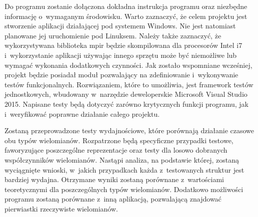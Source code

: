 Do programu zostanie dołączona dokładna instrukcja programu oraz niezbędne informację o~wymaganym środowisku. Warto zaznaczyć, że celem projektu jest stworzenie aplikacji działającej pod systemem Windows. Nie jest natomiast planowane jej uruchomienie pod Linuksem. Należy także zaznaczyć, że wykorzystywana biblioteka mpir będzie skompilowana dla procesorów Intel i7 i~wykorzystanie aplikacji używając innego sprzętu może być niemożliwe lub wymagać wykonania dodatkowych czynności.
Jak zostało wspomniane wcześniej, projekt będzie posiadał moduł pozwalający na zdefiniowanie i~wykonywanie testów funkcjonalnych. Rozwiązaniem, które to umożliwia, jest framework testów jednostkowych, wbudowany w~narzędzie deweloperskie Microsoft Visual Studio 2015. Napisane testy będą dotyczyć zarówno krytycznych funkcji programu, jak i~weryfikować poprawne działanie całego projektu.

Zostaną przeprowadzone testy wydajnościowe, które porównają działanie czasowe obu typów wielomianów. Rozpatrzone będą specyficzne przypadki testowe, faworyzujące poszczególne reprezentacje oraz testy dla losowo dobranych współczynników wielomianów. Nastąpi analiza, na podstawie której, zostaną wyciągnięte wnioski, w~jakich przypadkach każda z~testowanych struktur jest bardziej wydajna. Otrzymane wyniki zostaną porównane z~wartościami teoretycznymi dla poszczególnych typów wielomianów. Dodatkowo możliwości programu zostaną porównane z~inną aplikacją, pozwalającą znajdować pierwiastki rzeczywiste wielomianów.
